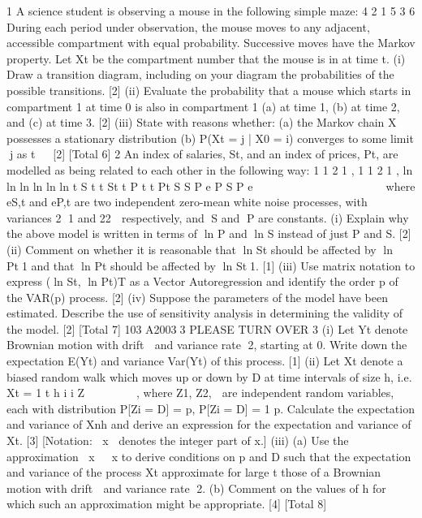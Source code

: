 
1 A science student is observing a mouse in the following simple maze:
4
2
1 5
3
6
During each period under observation, the mouse moves to any adjacent, accessible
compartment with equal probability. Successive moves have the Markov property.
Let Xt be the compartment number that the mouse is in at time t.
(i) Draw a transition diagram, including on your diagram the probabilities of the
possible transitions. [2]
(ii) Evaluate the probability that a mouse which starts in compartment 1 at time 0
is also in compartment 1 (a) at time 1, (b) at time 2, and (c) at time 3. [2]
(iii) State with reasons whether:
(a) the Markov chain X possesses a stationary distribution
(b) P(Xt = j | X0 = i) converges to some limit j as t   [2]
[Total 6]
2 An index of salaries, St, and an index of prices, Pt, are modelled as being related to
each other in the following way:
1 1 2 1 ,
1 1 2 1 ,
ln ln ln
ln ln ln
t S t t St
t P t t Pt
S S P e
P S P e
 
 
    
    
where eS,t and eP,t are two independent zero-mean white noise processes, with
variances 2
1 and 22
 respectively, and S and P are constants.
(i) Explain why the above model is written in terms of ln P and ln S instead of
just P and S. [2]
(ii) Comment on whether it is reasonable that ln St should be affected by
ln Pt1 and that ln Pt should be affected by ln St1. [1]
(iii) Use matrix notation to express (ln St, ln Pt)T as a Vector Autoregression
and identify the order p of the VAR(p) process. [2]
(iv) Suppose the parameters of the model have been estimated. Describe the use of
sensitivity analysis in determining the validity of the model. [2]
[Total 7]
103 A20033 PLEASE TURN OVER
3 (i) Let Yt denote Brownian motion with drift  and variance rate 2, starting at 0.
Write down the expectation E(Yt) and variance Var(Yt) of this process. [1]
(ii) Let Xt denote a biased random walk which moves up or down by D at time
intervals of size h, i.e.
Xt = 1
t
h
i i Z
 
 
  ,
where Z1, Z2,  are independent random variables, each with distribution
P[Zi = D] = p, P[Zi = 	D] = 1 	 p. Calculate the expectation and variance of
Xnh and derive an expression for the expectation and variance of Xt. [3]
[Notation: x denotes the integer part of x.]
(iii) (a) Use the approximation x  x to derive conditions on p and D such
that the expectation and variance of the process Xt approximate for
large t those of a Brownian motion with drift  and variance rate 2.
(b) Comment on the values of h for which such an approximation might be
appropriate.
[4]
[Total 8]

